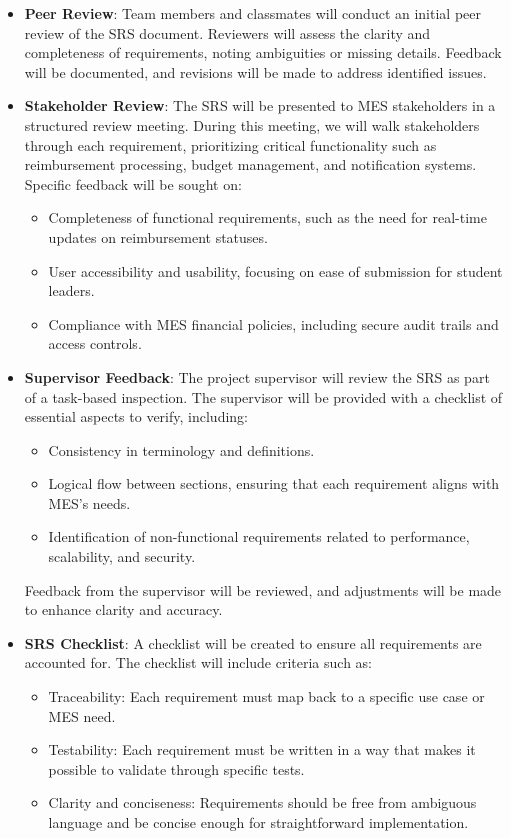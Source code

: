 \documentclass[12pt, titlepage]{article}
\begin{document}
\begin{itemize}
    \item \textbf{Peer Review}: Team members and classmates will conduct an initial peer review of the SRS document. Reviewers will assess the clarity and completeness of requirements, noting ambiguities or missing details. Feedback will be documented, and revisions will be made to address identified issues.
    
    \item \textbf{Stakeholder Review}: The SRS will be presented to MES stakeholders in a structured review meeting. During this meeting, we will walk stakeholders through each requirement, prioritizing critical functionality such as reimbursement processing, budget management, and notification systems. Specific feedback will be sought on:
    \begin{itemize}
        \item Completeness of functional requirements, such as the need for real-time updates on reimbursement statuses.
        \item User accessibility and usability, focusing on ease of submission for student leaders.
        \item Compliance with MES financial policies, including secure audit trails and access controls.
    \end{itemize}
    
    \item \textbf{Supervisor Feedback}: The project supervisor will review the SRS as part of a task-based inspection. The supervisor will be provided with a checklist of essential aspects to verify, including:
    \begin{itemize}
        \item Consistency in terminology and definitions.
        \item Logical flow between sections, ensuring that each requirement aligns with MES’s needs.
        \item Identification of non-functional requirements related to performance, scalability, and security.
    \end{itemize}
    Feedback from the supervisor will be reviewed, and adjustments will be made to enhance clarity and accuracy.

    \item \textbf{SRS Checklist}: A checklist will be created to ensure all requirements are accounted for. The checklist will include criteria such as:
    \begin{itemize}
        \item Traceability: Each requirement must map back to a specific use case or MES need.
        \item Testability: Each requirement must be written in a way that makes it possible to validate through specific tests.
        \item Clarity and conciseness: Requirements should be free from ambiguous language and be concise enough for straightforward implementation.
    \end{itemize}
\end{itemize}
\end{document}
